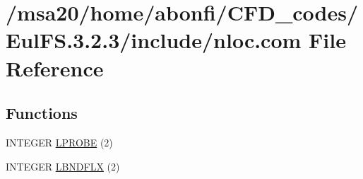 \hypertarget{msa20_2home_2abonfi_2_c_f_d__codes_2_eul_f_s_83_82_83_2include_2nloc_8com}{\section{/msa20/home/abonfi/\-C\-F\-D\-\_\-codes/\-Eul\-F\-S.3.2.3/include/nloc.com File Reference}
\label{msa20_2home_2abonfi_2_c_f_d__codes_2_eul_f_s_83_82_83_2include_2nloc_8com}
}
\subsection*{Functions}
\begin{DoxyCompactItemize}
\item 
I\-N\-T\-E\-G\-E\-R \hyperlink{msa20_2home_2abonfi_2_c_f_d__codes_2_eul_f_s_83_82_83_2include_2nloc_8com_ade8755dc46f6ab90e43b675468447a6a}{L\-P\-R\-O\-B\-E} (2)
\item 
I\-N\-T\-E\-G\-E\-R \hyperlink{msa20_2home_2abonfi_2_c_f_d__codes_2_eul_f_s_83_82_83_2include_2nloc_8com_a7878a6929dd0bb737d94892ae3d464be}{L\-B\-N\-D\-F\-L\-X} (2)
\end{DoxyCompactItemize}
